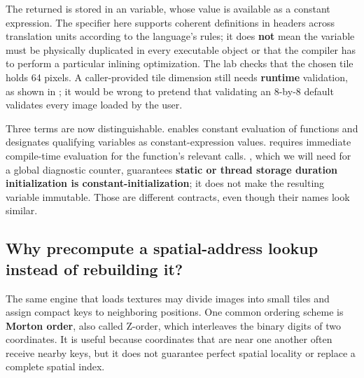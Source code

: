 The returned  is stored in an  variable, whose value is available as a constant expression. The  specifier here supports coherent definitions in headers across translation units according to the language's rules; it does \textbf{not} mean the variable must be physically duplicated in every executable object or that the compiler has to perform a particular inlining optimization. The lab checks that the chosen tile holds 64 pixels. A caller-provided tile dimension still needs \textbf{runtime} validation, as shown in ; it would be wrong to pretend that validating an 8-by-8 default validates every image loaded by the user.

Three terms are now distinguishable.  enables constant evaluation of functions and designates qualifying variables as constant-expression values.  requires immediate compile-time evaluation for the function's relevant calls. , which we will need for a global diagnostic counter, guarantees \textbf{static or thread storage duration initialization is constant-initialization}; it does not make the resulting variable immutable. Those are different contracts, even though their names look similar.

\subsection{Why precompute a spatial-address lookup instead of rebuilding it?}\label{01-foundations-i-ch005-why-precompute-a-spatial-address-lookup-instead-of-rebuilding-it}

\hypertarget{01-foundations-i-ch005-why-precompute-a-spatial-address-lookup-instead-of-rebuilding-it}{}

The same engine that loads textures may divide images into small tiles and assign compact keys to neighboring positions. One common ordering scheme is \textbf{Morton order}, also called Z-order, which interleaves the binary digits of two coordinates. It is useful because coordinates that are near one another often receive nearby keys, but it does not guarantee perfect spatial locality or replace a complete spatial index.

